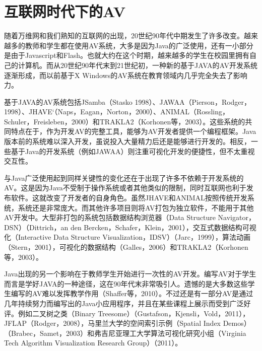 \chapter{互联网时代下的AV}
\begin{sectext}
随着万维网和我们熟知的互联网的出现，20世纪90年代中期发生了许多改变。越来越多的教师和学生都在使用AV系统，大多是因为Java的广泛使用，还有一小部分是由于Javascript和Flash。也就大约在这个时期，越来越多的学生在校园里拥有自己的计算机。而从20世纪90年代末到21世纪初，一种新的基于JAVA的AV开发系统逐渐形成，而以前基于X Windows的AV系统在教育领域内几乎完全失去了影响力。

基于JAVA的AV系统包括JSamba（Stasko 1998）、JAWAA（Pierson，Rodger，1998）、JHAVE`（Naps，Eagan，Norton，2000）、ANIMAL（Rossling，Schuler，Freisleben，2000）和TRAKLA2（Korhonen等，2003）。这些系统的共同特点在于，作为开发AV的完整工具，能够为AV开发者提供一个编程框架。Java版本前的系统难以深入开发，虽说投入大量精力后还是能够进行开发的。相反，一些基于Java的开发系统（例如JAWAA）则注重可视化开发的便捷性，但不太重视交互性。

与Java广泛使用起到同样关键性的变化还在于出现了许多不依赖于开发系统的AV。这是因为Java不受制于操作系统或者其他类似的限制，同时互联网也利于发布软件。这就改变了开发者的自身角色。虽然JHAVE和ANIMAL按照传统开发系统，系统还是非常庞大。而其他许多项目则将AV打包为独立软件，不能用于其他AV开发中。大型非打包的系统包括数据结构浏览器（Data Structure Navigator，DSN）（Dittrich，an den Bercken，Schafer，Klein，2001），交互式数据结构可视化（Interactive Data Structure Visualization，IDSV）（Jarc，1999），算法动画（Stern，2001），可视化的数据结构（Galles，2006）和TRAKLA2（Korhonen等，2003）。

Java出现的另一个影响在于教师学生开始进行一次性的AV开发。编写AV对于学生而言是学好JAVA的一种途径，这在90年代末非常吸引人。遗憾的是大多数这些学生编写的AV难以发挥教学作用（Shaffer等，2010）。不过还是有一部分AV是通过几年持续努力而编写出的Java小应用程序，并且在某些课程上展示而受到广泛好评。例如二叉树之类（Binary Treesome）（Gustafson，Kjensli，Vold，2011），JFLAP（Rodger，2008），马里兰大学的空间索引示例（Spatial Index Demos）（Brabec，Samet，2003）和弗吉尼亚理工大学算法可视化研究小组（Virginia Tech Algorithm Visualization Research Group）（2011）。
\end{sectext}
